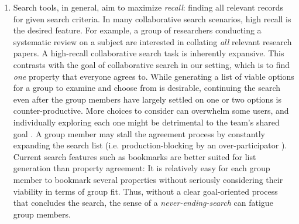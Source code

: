 \begin{enumerate}[label={}, leftmargin=0cm, itemindent=0.2cm]
    \item \cShiftingGoalPosts Search tools, in general, aim to maximize \textit{recall}: finding all relevant records for given search criteria. In many collaborative search scenarios, high recall is the desired feature. For example, a group of researchers conducting a systematic review on a subject are interested in collating \textit{all} relevant research papers. A high-recall collaborative search task is inherently expansive. This contrasts with the goal of collaborative search in our setting, which is to find \textit{one} property that everyone agrees to. While generating a list of viable options for a group to examine and choose from is desirable, continuing the search even after the group members have largely settled on one or two options is counter-productive. More choices to consider can overwhelm some users, and individually exploring each one might be detrimental to the team's shared goal \cite{themediationprocess}. A group member may stall the agreement process by constantly expanding the search list (i.e. production-blocking by an over-participator \cite{meetingmediator}). Current search features such as bookmarks are better suited for list generation than property agreement: It is relatively easy for each group member to bookmark several properties without seriously considering their viability in terms of group fit. Thus, without a clear goal-oriented process that concludes the search, the sense of a \textit{never-ending-search} can fatigue group members.
    
    



\end{enumerate}

